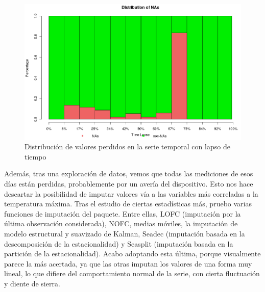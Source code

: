 \begin{figure}[H] %
	\centering
	\includegraphics[scale=0.23]{nadistbar.png}  %
	\caption{Distribución de valores perdidos en la serie temporal con lapso de tiempo} 
	\label{fig:na-distbar}
\end{figure}

Además, tras una exploración de datos, vemos que todas las mediciones de esos días están perdidas, probablemente por un avería del dispositivo. Esto nos hace descartar la posibilidad de imputar valores vía a las variables más correladas a la temperatura máxima. Tras el estudio de ciertas estadísticas más, pruebo varias funciones de imputación del paquete. Entre ellas, LOFC (imputación por la última observación considerada), NOFC, medias móviles, la imputación de modelo estructural y suavizado de Kalman,  Seadec (imputación basada en la descomposición de la estacionalidad) y Seasplit (imputación basada en la partición de la estacionalidad). Acabo adoptando esta última, porque visualmente parece la más acertada, ya que las otras imputan los valores de una forma muy lineal, lo que difiere del comportamiento normal de la serie, con cierta fluctuación y diente de sierra.

